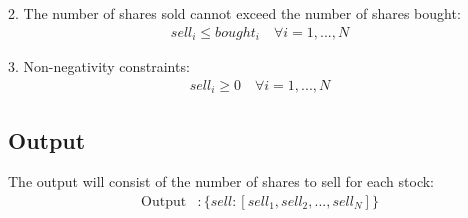 \documentclass{article}
\begin{document}
2. The number of shares sold cannot exceed the number of shares bought:
\begin{align}
sell_i \leq bought_i \quad \forall i = 1, ..., N
\end{align}

3. Non-negativity constraints:
\begin{align}
sell_i \geq 0 \quad \forall i = 1, ..., N
\end{align}

\subsection*{Output}
The output will consist of the number of shares to sell for each stock:
\begin{align*}
\text{Output} &: \{ sell : [sell_1, sell_2, ..., sell_N] \}
\end{align*}
\end{document}
